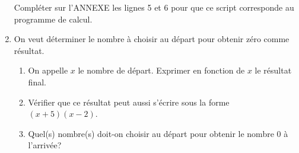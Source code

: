 \begin{enumerate}
Compléter sur l'ANNEXE  les lignes 5 et 6 pour que ce script corresponde au programme de calcul.
%
%
\item On veut déterminer le nombre à choisir au départ pour obtenir zéro comme résultat. 
	\begin{enumerate}
		\item On appelle $x$ le nombre de départ. Exprimer en fonction de $x$ le résultat final.
		\item Vérifier que ce résultat peut aussi s'écrire sous la forme $(x + 5)(x - 2)$.
		\item Quel(s) nombre(s) doit-on choisir au départ pour obtenir le nombre $0$ à l'arrivée?
	\end{enumerate}
\end{enumerate}

\bigskip

